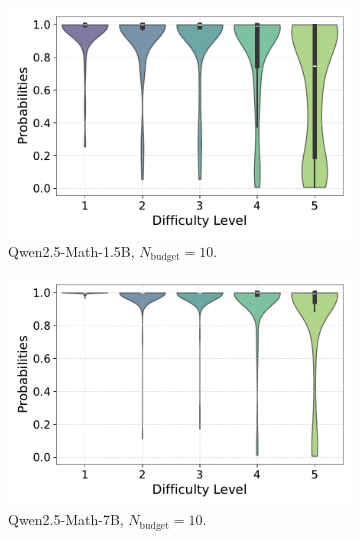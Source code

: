 \begin{figure}[h!]
  \centering
  \begin{subfigure}{0.49\textwidth}
      \centering
      \includegraphics[width=\textwidth]{figs/QWEN-MATH-1.5B_violin_maj10_probability_adaptive_01_NO_ground_truth.pdf}
      \caption{Qwen2.5-Math-1.5B, $N_{\text{budget}}=10$.}
      \label{fig:QWEN-MATH-1.5B_budget_10_NO_01}
  \end{subfigure}
  \hfill
  \begin{subfigure}{0.49\textwidth}
      \centering
      \includegraphics[width=\textwidth]{figs/QWEN-MATH-7B_violin_maj10_probability_adaptive_01_NO_ground_truth.pdf}
        \caption{Qwen2.5-Math-7B, $N_{\text{budget}}=10$.}
      \label{fig:QWEN-MATH-7B_budget_10_NO_01}
  \end{subfigure}
  \vfill
  \begin{subfigure}{0.49\textwidth}
      \centering

\end{subfigure}
\end{figure}

